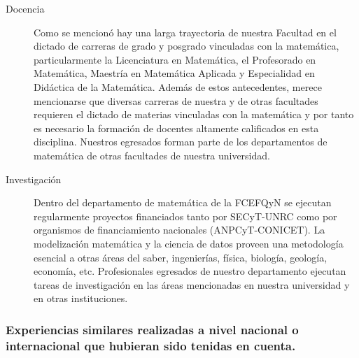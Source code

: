 \documentclass[a4paper, 12pt]{article}
\begin{document}
\begin{description}
 \item[Docencia] Como se mencionó hay una larga trayectoria  de nuestra Facultad en el dictado de carreras de grado y posgrado  vinculadas con la matemática, particularmente la Licenciatura en Matemática, el Profesorado en Matemática, Maestría en Matemática Aplicada y Especialidad en Didáctica de la Matemática. Además de estos antecedentes, merece mencionarse que diversas carreras de nuestra y de otras facultades requieren el dictado de materias vinculadas con la matemática y por tanto es necesario la formación de docentes altamente calificados en esta disciplina. Nuestros egresados forman parte de los departamentos de matemática de otras facultades de nuestra universidad.
 
 \item[Investigación] Dentro del departamento de matemática de la FCEFQyN se ejecutan regularmente  proyectos financiados tanto por SECyT-UNRC como por organismos de financiamiento nacionales (ANPCyT-CONICET). La modelización matemática y la ciencia de datos proveen una metodología esencial a otras áreas del saber, ingenierías, física, biología, geología, economía, etc. Profesionales egresados de nuestro departamento ejecutan tareas de investigación en las áreas mencionadas en nuestra universidad y en otras instituciones.
 
 
\end{description}






\subsubsection{Experiencias similares realizadas a nivel nacional o internacional que hubieran sido tenidas en cuenta.}
\end{document}
